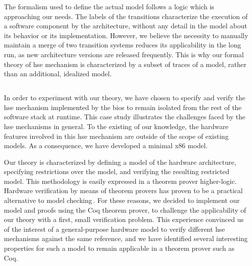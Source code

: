 %
The formalism used to define the actual model follows a logic which is
approaching our needs.
%
The labels of the transitions characterize the execution of a software component
by the architecture, without any detail in the model about its behavior or its
implementation.
%
However, we believe the necessity to manually maintain a merge of two transition
systems reduces its applicability in the long run, as new architecture versions
are released frequently.
%
This is why our formal theory of \ac{hse} mechanism is characterized by a subset
of traces of a model, rather than an additional, idealized model.
%

\subsection*{}

In order to experiment with our theory, we have chosen to specify and verify the
\ac{hse} mechanism implemented by the \ac{bios} to remain isolated from the rest
of the software stack at runtime.
%
This case study illustrates the challenges faced by the \ac{hse} mechanisms in
general.
%
To the existing of our knowledge, the hardware features involved in this
\ac{hse} mechanism are outside of the scope of existing models.
%
As a consequence, we have developed a minimal x86 model.

Our theory is characterized by defining a model of the hardware architecture,
specifying restrictions over the model, and verifying the resulting restricted
model.
%
This methodology is easily expressed in a theorem prover higher-logic.
%
Hardware verification by means of theorem provers has proven to be a practical
alternative to model checking\,\cite{vijayaraghavan2015modular,choi2017kami}.
%
For these reasons, we decided to implement our model and proofs using the Coq
theorem prover, to challenge the applicability of our theory with a first, small
verification problem.
%
This experience convinced us of the interest of a general-purpose hardware model
to verify different \ac{hse} mechanisms against the same reference, and we have
identified several interesting properties for such a model to remain applicable
in a theorem prover such as Coq.

